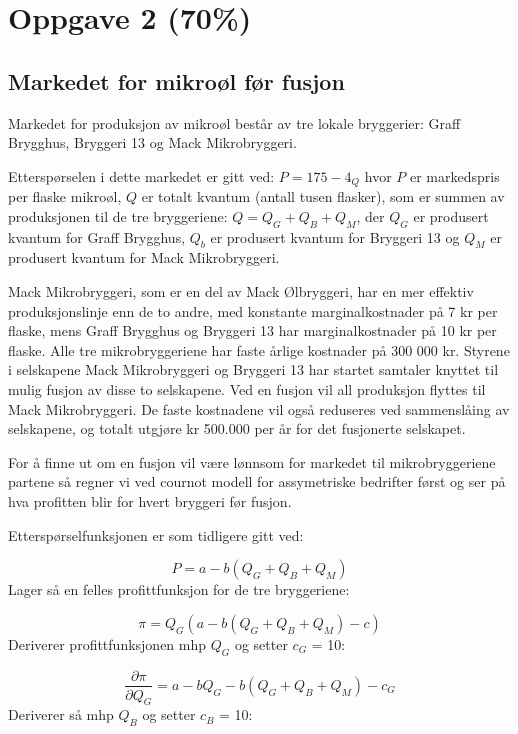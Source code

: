 \documentclass[
  12pt,
  a4paper,
  DIV=11,
  numbers=noendperiod]{scrartcl}
\begin{document}
\clearpage

\section{Oppgave 2 (70\%)}\label{oppgave-2-70}

\subsection{Markedet for mikroøl før
fusjon}\label{markedet-for-mikrouxf8l-fuxf8r-fusjon}

Markedet for produksjon av mikroøl består av tre lokale bryggerier:
Graff Brygghus, Bryggeri 13 og Mack Mikrobryggeri.

Etterspørselen i dette markedet er gitt ved: \(P = 175 − 4_Q\) hvor
\(P\) er markedspris per flaske mikroøl, \(Q\) er totalt kvantum (antall
tusen flasker), som er summen av produksjonen til de tre bryggeriene:
\(Q = Q_G + Q_B + Q_M\), der \(Q_G\) er produsert kvantum for Graff
Brygghus, \(Q_b\) er produsert kvantum for Bryggeri 13 og \(Q_M\) er
produsert kvantum for Mack Mikrobryggeri.

Mack Mikrobryggeri, som er en del av Mack Ølbryggeri, har en mer
effektiv produksjonslinje enn de to andre, med konstante
marginalkostnader på 7 kr per flaske, mens Graff Brygghus og Bryggeri 13
har marginalkostnader på 10 kr per flaske. Alle tre mikrobryggeriene har
faste årlige kostnader på 300 000 kr. Styrene i selskapene Mack
Mikrobryggeri og Bryggeri 13 har startet samtaler knyttet til mulig
fusjon av disse to selskapene. Ved en fusjon vil all produksjon flyttes
til Mack Mikrobryggeri. De faste kostnadene vil også reduseres ved
sammenslåing av selskapene, og totalt utgjøre kr 500.000 per år for det
fusjonerte selskapet.

For å finne ut om en fusjon vil være lønnsom for markedet til
mikrobryggeriene partene så regner vi ved cournot modell for
assymetriske bedrifter først og ser på hva profitten blir for hvert
bryggeri før fusjon.

Etterspørselfunksjonen er som tidligere gitt ved:

\[P = a - b(Q_G+Q_B+Q_M) \tag{17}\] Lager så en felles profittfunksjon
for de tre bryggeriene:

\[\pi = Q_G(a-b(Q_G+Q_B+Q_M)-c) \tag{18}\] Deriverer profittfunksjonen
mhp \(Q_G\) og setter \(c_G\) = 10:

\[\frac{\partial \pi}{\partial Q_G} = a - bQ_G - b(Q_G+Q_B+Q_M) -c_G \tag{19}\]
Deriverer så mhp \(Q_B\) og setter \(c_B\) = 10:
\end{document}
